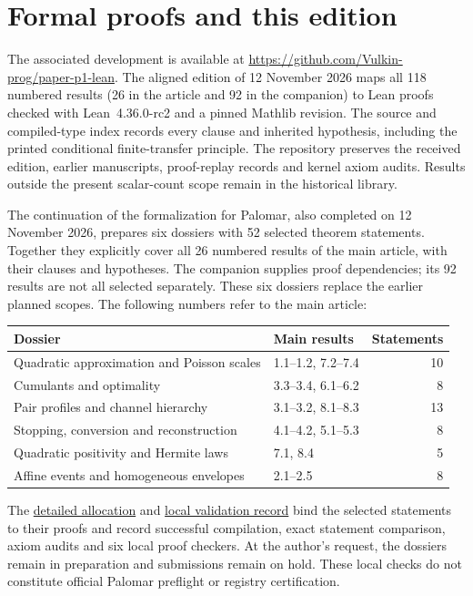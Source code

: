 \section*{Formal proofs and this edition}
The associated development is available at
\url{https://github.com/Vulkin-prog/paper-p1-lean}.
The aligned edition of 12 November 2026 maps all 118 numbered results
(26 in the article and 92 in the companion) to Lean proofs checked
with Lean~4.36.0-rc2 and a pinned Mathlib revision.
The source and compiled-type index records every clause and inherited
hypothesis, including the printed conditional finite-transfer principle.
The repository preserves the received edition, earlier manuscripts,
proof-replay records and kernel axiom audits. Results outside the present
scalar-count scope remain in the historical library.

The continuation of the formalization for Palomar, also completed on
12 November 2026, prepares six dossiers with 52 selected theorem statements.
Together they explicitly cover all 26 numbered results of the main article,
with their clauses and hypotheses. The companion supplies proof dependencies;
its 92 results are not all selected separately. These six dossiers replace
the earlier planned scopes. The following numbers refer to the main article:
\begin{center}
\small
\begin{tabularx}{\linewidth}{@{}Xlr@{}}
\toprule
Dossier & Main results & Statements\\
\midrule
Quadratic approximation and Poisson scales & 1.1--1.2, 7.2--7.4 & 10\\
Cumulants and optimality & 3.3--3.4, 6.1--6.2 & 8\\
Pair profiles and channel hierarchy & 3.1--3.2, 8.1--8.3 & 13\\
Stopping, conversion and reconstruction & 4.1--4.2, 5.1--5.3 & 8\\
Quadratic positivity and Hermite laws & 7.1, 8.4 & 5\\
Affine events and homogeneous envelopes & 2.1--2.5 & 8\\
\bottomrule
\end{tabularx}
\end{center}
The \href{https://github.com/Vulkin-prog/paper-p1-lean/blob/8b7cc02210a82212bd0730371ff69cf4e69c32ad/palomar/REGISTRATION_PLAN_V2.json}{detailed allocation}
and \href{https://github.com/Vulkin-prog/paper-p1-lean/blob/8b7cc02210a82212bd0730371ff69cf4e69c32ad/palomar/v3/VALIDATION.json}{local validation record}
bind the selected statements to their proofs and record successful compilation,
exact statement comparison, axiom audits and six local proof checkers.
At the author's request, the dossiers remain in preparation and submissions
remain on hold. These local checks do not constitute official Palomar preflight
or registry certification.

